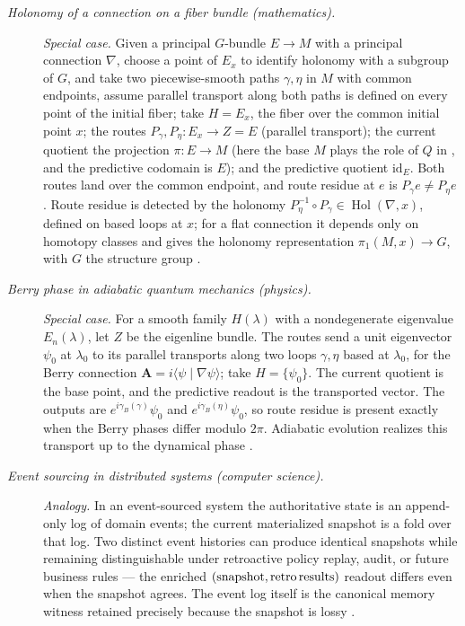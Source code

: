 \begingroup\small
\begin{description}
\item[\emph{Holonomy of a connection on a fiber bundle
(mathematics).}] \textit{Special case.}
Given a principal \(G\)-bundle \(E\to M\) with a principal connection \(\nabla\), choose a point of \(E_x\) to identify holonomy with a subgroup of \(G\), and take two
piecewise-smooth paths \(\gamma, \eta\) in \(M\) with common
endpoints, assume parallel transport along both paths is defined on every
point of the initial fiber; take \(H=E_x\), the fiber over the common initial point \(x\); the
routes \(P_\gamma,P_\eta:E_x\to Z=E\) (parallel transport); the current
quotient the projection \(\pi:E\to M\) (here the base \(M\) plays the role of \(Q\) in , and the predictive codomain is \(E\)); and the predictive quotient
\(\mathrm{id}_E\). Both routes land over the common endpoint, and route
residue at \(e\) is \(P_\gamma e\ne P_\eta e\). Route residue is detected by
the holonomy
\(P_\eta^{-1} \circ P_\gamma \in \operatorname{Hol}(\nabla, x)\),
defined on based loops at \(x\); for a flat connection it depends
only on homotopy classes and gives the holonomy representation
\(\pi_1(M, x) \to G\), with \(G\) the structure group
\citep{KobayashiNomizu1963Foundations}.

\item[\emph{Berry phase in adiabatic quantum mechanics (physics).}] \textit{Special case.}
For a smooth family \(H(\lambda)\) with a nondegenerate eigenvalue
\(E_n(\lambda)\), let \(Z\) be the eigenline bundle. The routes send a unit
eigenvector \(\psi_0\) at \(\lambda_0\) to its parallel transports along two
loops \(\gamma,\eta\) based at \(\lambda_0\), for the Berry connection
\(\mathbf A = i\langle \psi \mid \nabla \psi\rangle\); take \(H=\{\psi_0\}\). The current quotient is the base point, and the predictive readout
is the transported vector. The outputs are \(e^{i\gamma_B(\gamma)}\psi_0\) and
\(e^{i\gamma_B(\eta)}\psi_0\), so route residue is present exactly when the
Berry phases differ modulo \(2\pi\). Adiabatic evolution realizes this
transport up to the dynamical phase \citep{Berry1984QuantalPhase}.

\item[\emph{Event sourcing in distributed systems (computer
science).}] \textit{Analogy.}
In an event-sourced system the authoritative state is an
append-only log of domain events; the current materialized snapshot
is a fold over that log.  Two distinct event histories can produce
identical snapshots while remaining distinguishable under
retroactive policy replay, audit, or future business rules — the
enriched \((\text{snapshot}, \text{retro\,results})\) readout
differs even when the snapshot agrees.  The event log itself is the
canonical memory witness retained precisely because the snapshot
is lossy \citep{Kleppmann2017DDIA}.


\end{description}
